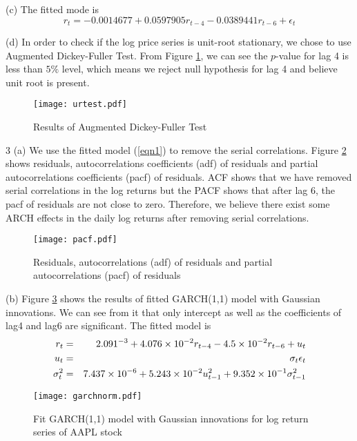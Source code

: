 \documentclass[11pt]{article}
\begin{document}
(c)
The fitted mode is
\begin{equation}\label{eqn1}
r_t=-0.0014677+0.0597905r_{t-4}-0.0389441r_{t-6}+\epsilon_t
\end{equation}

(d)
In order to check if the log price series is unit-root stationary, we chose to use Augmented Dickey-Fuller Test. From Figure \ref{urtest}, we can see the $p$-value for lag 4 is less than $5\%$ level, which means we reject null hypothesis for lag 4 and believe unit root is present.
\begin{figure}
\centering
\texttt{[image: urtest.pdf]}
\caption{Results of Augmented Dickey-Fuller Test   }
\label{urtest}
\end{figure}

3 (a)
We use the fitted model (\ref{eqn1}) to remove the serial correlations. Figure \ref{pacf} shows residuals, autocorrelations coefficients (adf) of residuals and partial autocorrelations coefficients (pacf) of residuals. ACF shows that we have removed serial correlations in the log returns but the PACF shows that after lag 6, the pacf of residuals are not close to zero. Therefore, we believe there exist some ARCH effects in the daily log returns after removing serial correlations.

\begin{figure}
\centering
\texttt{[image: pacf.pdf]}
\caption{Residuals, autocorrelations (adf) of residuals and partial autocorrelations (pacf) of residuals  }
\label{pacf}
\end{figure}

(b)
Figure \ref{garchnom} shows the results of fitted GARCH(1,1) model with Gaussian innovations. We can see from it that only intercept as well as the coefficients of lag4 and lag6 are significant. The fitted model is
\begin{eqnarray*}
r_t&=& 2.091\time10^{-3}+4.076\times10^{-2}r_{t-4}-4.5\times10^{-2}r_{t-6}+u_t\\
u_t&=&\sigma_t\epsilon_t\\
\sigma^2_t&=&7.437\times 10^{-6}+5.243\times10^{-2}u^2_{t-1}+9.352\times10^{-1}\sigma^2_{t-1}
\end{eqnarray*}

\begin{figure}
\centering
\texttt{[image: garchnorm.pdf]}
\caption{Fit GARCH(1,1) model with Gaussian innovations for log return series of AAPL stock  }
\label{garchnom}
\end{figure}
\end{document}
